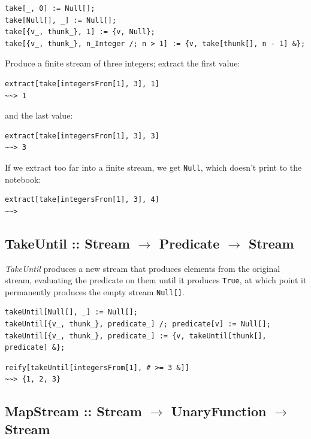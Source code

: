 \documentclass[10pt,oneside,x11names]{article}
\begin{document}
\begin{verbatim}
take[_, 0] := Null[];
take[Null[], _] := Null[];
take[{v_, thunk_}, 1] := {v, Null};
take[{v_, thunk_}, n_Integer /; n > 1] := {v, take[thunk[], n - 1] &};
\end{verbatim}

Produce a finite stream of three integers; extract the first value:

\begin{verbatim}
extract[take[integersFrom[1], 3], 1]
~~> 1
\end{verbatim}

\noindent and the last value:

\begin{verbatim}
extract[take[integersFrom[1], 3], 3]
~~> 3
\end{verbatim}

\noindent If we extract too far into a finite stream, we get \texttt{Null}, which doesn't print to the notebook:

\begin{verbatim}
extract[take[integersFrom[1], 3], 4]
~~>
\end{verbatim}

\subsection{TakeUntil :: Stream \(\rightarrow\) Predicate \(\rightarrow\) Stream}
\label{sec:orgheadline8}

\emph{TakeUntil} produces a new stream that produces elements from the original
stream, evaluating the predicate on them until it produces \texttt{True}, at which
point it permanently produces the empty stream \texttt{Null[]}.

\begin{verbatim}
takeUntil[Null[], _] := Null[];
takeUntil[{v_, thunk_}, predicate_] /; predicate[v] := Null[];
takeUntil[{v_, thunk_}, predicate_] := {v, takeUntil[thunk[], predicate] &};
\end{verbatim}

\begin{verbatim}
reify[takeUntil[integersFrom[1], # >= 3 &]]
~~> {1, 2, 3}
\end{verbatim}

\subsection{MapStream :: Stream \(\rightarrow\) UnaryFunction \(\rightarrow\) Stream}
\label{sec:orgheadline9}
\end{document}

